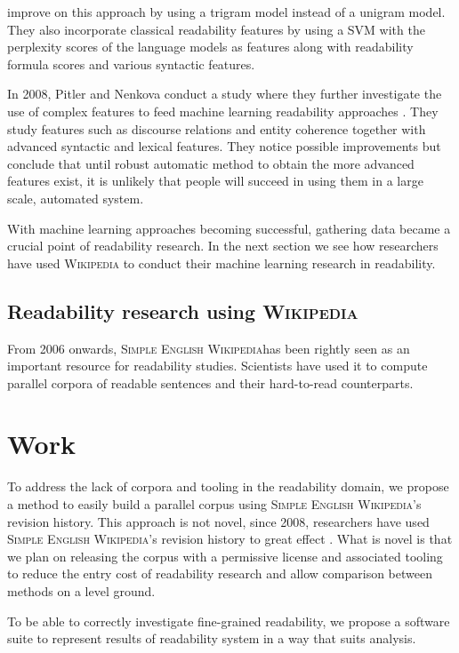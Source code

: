 \documentclass[a4paper, 11pt, onepage]{scrreprt}
\newcommand\wiki{\textsc{Wikipedia}}
\newcommand\sew{\textsc{Simple English Wikipedia}}
\begin{document}
\cite{schwarm2005reading} improve on this approach by using a trigram
model instead of a unigram model. They also incorporate classical
readability features by using a SVM with the perplexity scores of the
language models as features along with readability formula scores and
various syntactic features.

In 2008, Pitler and Nenkova conduct a study where they further
investigate the use of complex features to feed machine learning
readability approaches \cite{pitler2008revisiting}. They study
features such as discourse relations and entity coherence together
with advanced syntactic and lexical features. They notice possible
improvements but conclude that until robust automatic method to obtain
the more advanced features exist, it is unlikely that people will
succeed in using them in a large scale, automated system.

With machine learning approaches becoming successful, gathering data
became a crucial point of readability research. In the next section we
see how researchers have used \wiki{} to conduct their machine
learning research in readability.

\section{Readability research using \wiki}
\label{sec:wiki-approaches}

From 2006 onwards, \sew has been rightly seen as an important resource
for readability studies. Scientists have used it to compute parallel
corpora of readable sentences and their hard-to-read counterparts.

\chapter{Work}
\label{cha:work}

To address the lack of corpora and tooling in the readability domain,
we propose a method to easily build a parallel corpus using \sew's
revision history. This approach is not novel, since 2008, researchers
have used \sew's revision history to great effect
\cite{nelken2008mining}. What is novel is that we plan on releasing
the corpus with a permissive license and associated tooling to reduce
the entry cost of readability research and allow comparison between
methods on a level ground.

To be able to correctly investigate fine-grained readability, we
propose a software suite to represent results of readability system in
a way that suits analysis.
\end{document}
